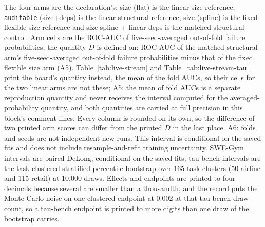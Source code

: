 The four arms are the declaration's: size (flat) is the linear size reference, \texttt{auditable} (size+deps) is the linear structural reference, size (spline) is the fixed flexible size reference and size-spline + linear-deps is the matched structural control.
Arm cells are the ROC-AUC of five-seed-averaged out-of-fold failure probabilities, the quantity $D$ is defined on: ROC-AUC of the matched structural arm's five-seed-averaged out-of-fold failure probabilities minus that of the fixed flexible size arm (A5).
Table~\ref{tab:live-stream} and Table~\ref{tab:live-stream-tau} print the board's quantity instead, the mean of the fold AUCs, so their cells for the two linear arms are not these; A5: the mean of fold AUCs is a separate reproduction quantity and never receives the interval computed for the averaged-probability quantity, and both quantities are carried at full precision in this block's comment lines.
Every column is rounded on its own, so the difference of two printed arm scores can differ from the printed $D$ in the last place.
A6: folds and seeds are not independent new runs. This interval is conditional on the saved fits and does not include resample-and-refit training uncertainty.
SWE-Gym intervals are paired DeLong, conditional on the saved fits; tau-bench intervals are the task-clustered stratified percentile bootstrap over 165 task clusters (50 airline and 115 retail) at 10,000 draws.
Effects and endpoints are printed to four decimals because several are smaller than a thousandth, and the record puts the Monte Carlo noise on one clustered endpoint at 0.002 at that tau-bench draw count, so a tau-bench endpoint is printed to more digits than one draw of the bootstrap carries.
